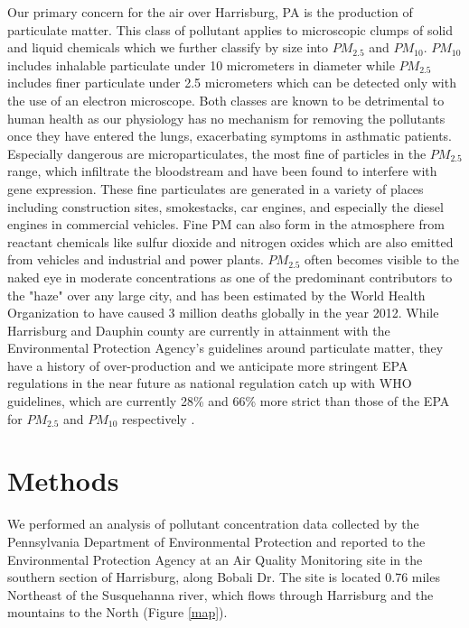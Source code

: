 \documentclass[11pt,journal]{IEEEtran}
\begin{document}
Our primary concern for the air over Harrisburg, PA is the production of particulate matter. This class of pollutant applies to microscopic clumps of solid and liquid chemicals which we further classify by size into $PM_{2.5}$ and $PM_{10}$. $PM_{10}$ includes inhalable particulate under 10 micrometers in diameter while $PM_{2.5}$ includes finer particulate under 2.5 micrometers which can be detected only with the use of an electron microscope. Both classes are known to be detrimental to human health as our physiology has no mechanism for removing the pollutants once they have entered the lungs, exacerbating symptoms in asthmatic patients\cite{asthma}. Especially dangerous are microparticulates, the most fine of particles in the $PM_{2.5}$ range, which infiltrate the bloodstream and have been found to interfere with gene expression\cite{acute}. These fine particulates are generated in a variety of places including construction sites, smokestacks, car engines, and especially the diesel engines in commercial vehicles. Fine PM can also form in the atmosphere from reactant chemicals like sulfur dioxide and nitrogen oxides which are also emitted from vehicles and industrial and power plants. $PM_{2.5}$ often becomes visible to the naked eye in moderate concentrations as one of the predominant contributors to the "haze" over any large city, and has been estimated by the World Health Organization to have caused 3 million deaths globally in the year 2012\cite{who}. While Harrisburg and Dauphin county are currently in attainment with the Environmental Protection Agency's guidelines around particulate matter, they have a history of over-production and we anticipate more stringent EPA regulations in the near future as national regulation catch up with WHO guidelines, which are currently 28\% and 66\% more strict than those of the EPA for $PM_{2.5}$ and $PM_{10}$ respectively \cite{vahlsing}.


\section{Methods}

We performed an analysis of pollutant concentration data collected by the Pennsylvania Department of Environmental Protection and reported to the Environmental Protection Agency at an Air Quality Monitoring site in the southern section of Harrisburg, along Bobali Dr. The site is located 0.76 miles Northeast of the Susquehanna river, which flows through Harrisburg and the mountains to the North (Figure \ref{map}).
\end{document}
